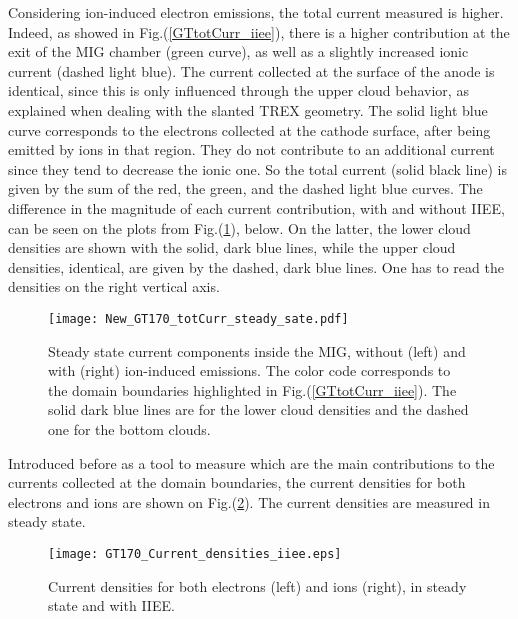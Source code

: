\noindent Considering ion-induced electron emissions, the total current measured is higher. Indeed, as showed in Fig.(\ref{GTtotCurr_iiee}), there is a higher contribution at the exit of the MIG chamber (green curve), as well as a slightly increased ionic current (dashed light blue). The current collected at the surface of the anode is identical, since this is only influenced through the upper cloud behavior, as explained when dealing with the slanted TREX geometry. The solid light blue curve corresponds to the electrons collected at the cathode surface, after being emitted by ions in that region. They do not contribute to an additional current since they tend to decrease the ionic one. So the total current (solid black line) is given by the sum of the red, the green, and the dashed light blue curves. The difference in the magnitude of each current contribution, with and without IIEE, can be seen on the plots from Fig.(\ref{GTtotCurr_steadyState}), below. On the latter, the lower cloud densities are shown with the solid, dark blue lines, while the upper cloud densities, identical, are given by the dashed, dark blue lines. One has to read the densities on the right vertical axis.\\

\begin{figure}[h!]
\centering
	\texttt{[image: New\_GT170\_totCurr\_steady\_sate.pdf]}
	\caption{\label{GTtotCurr_steadyState} Steady state current components inside the MIG, without (left) and with (right) ion-induced emissions. The color code corresponds to the domain boundaries highlighted in Fig.(\ref{GTtotCurr_iiee}). The solid dark blue lines are for the lower cloud densities and the dashed one for the bottom clouds.}
\end{figure}


\noindent Introduced before as a tool to measure which are the main contributions to the currents collected at the domain boundaries, the current densities for both electrons and ions are shown on Fig.(\ref{GT170_CurrDens}). The current densities are measured in steady state.  

\begin{figure}[h!]
\centering
	\texttt{[image: GT170\_Current\_densities\_iiee.eps]}
	\caption{\label{GT170_CurrDens} Current densities for both electrons (left) and ions (right), in steady state and with IIEE.}
\end{figure}

